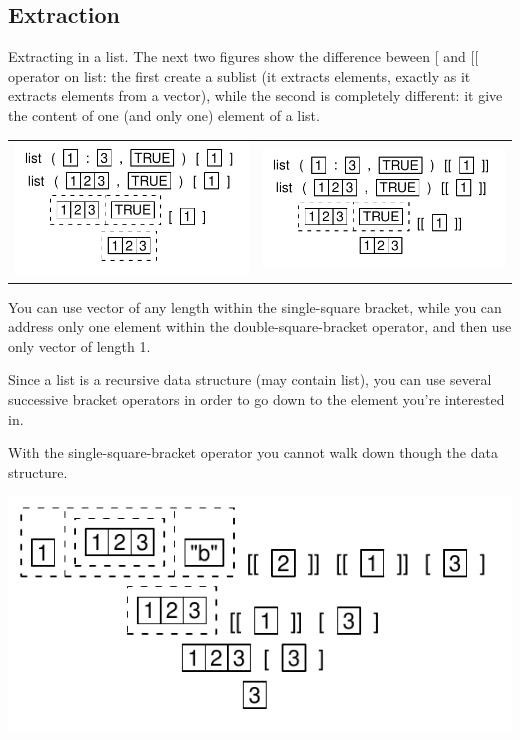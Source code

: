 \documentclass[pdflatex]{article}
\begin{document}
\subsection{Extraction}

Extracting in a list. The next two figures show the difference beween [ and [[ operator on list: the first create a sublist (it extracts elements, exactly as it extracts elements from a vector), while the second is completely different: it give the content of one (and only one) element of a list.

\begin{tabular}{cc}
\includegraphics{list_extract_simple.pdf} & \includegraphics{list_extract_double.pdf}
\end{tabular}

You can use vector of any length within the single-square bracket, while you can address only one element within the double-square-bracket operator, and then use only vector of length 1.

Since a list is a recursive data structure (may contain list), you can use several successive bracket operators in order to go down to the element you're interested in.

With the single-square-bracket operator you cannot walk down though the data structure.

\includegraphics{list_successive_extraction}
\end{document}
